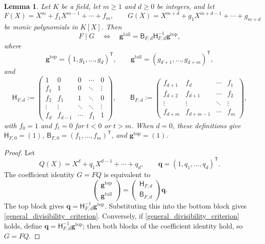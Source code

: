 \documentclass[12pt]{article}
\newtheorem{lemma}{Lemma}[section]
\theoremstyle{remark}
\begin{document}
\begin{lemma}\label{toeplitzdivision}
Let $K$ be a field, let $m\ge1$ and $d\ge0$ be integers, and let
\[
 F(X)=X^m+f_1X^{m-1}+\cdots+f_m,
 \qquad
 G(X)=X^{m+d}+g_1X^{m+d-1}+\cdots+g_{m+d}
\]
be monic polynomials in $K[X]$.  Then
\begin{equation}\label{general_divisibility_criterion}
 F\mid G
 \quad\Longleftrightarrow\quad
 \mathbf g^{\mathrm{tail}}
 =\mathsf B_{F,d}\mathsf H_{F,d}^{-1}\mathbf g^{\mathrm{top}},
\end{equation}
where
\[
 \mathbf g^{\mathrm{top}}=(1,g_1,\ldots,g_d)^{\mathsf T},
 \qquad
 \mathbf g^{\mathrm{tail}}=(g_{d+1},\ldots,g_{d+m})^{\mathsf T},
\]
and
\[
 \mathsf H_{F,d}:=
 \begin{pmatrix}
  1&0&0&\cdots&0\\
  f_1&1&0&\ddots&\vdots\\
  f_2&f_1&1&\ddots&0\\
  \vdots&\vdots&\ddots&\ddots&\vdots\\
  f_d&f_{d-1}&\cdots&f_1&1
 \end{pmatrix},
 \qquad
 \mathsf B_{F,d}:=
 \begin{pmatrix}
  f_{d+1}&f_d&\cdots&f_1\\
  f_{d+2}&f_{d+1}&\cdots&f_2\\
  \vdots&\vdots&\ddots&\vdots\\
  f_{d+m}&f_{d+m-1}&\cdots&f_m
 \end{pmatrix},
\]
with $f_0=1$ and $f_t=0$ for $t<0$ or $t>m$.
When $d=0$, these definitions give
$\mathsf H_{F,0}=(1)$, $\mathsf B_{F,0}=(f_1,\ldots,f_m)^{\mathsf T}$,
and $\mathbf g^{\mathrm{top}}=(1)$.
\end{lemma}
\begin{proof}
Let
\[
 Q(X)=X^d+q_1X^{d-1}+\cdots+q_d,
 \qquad
 \mathbf q=(1,q_1,\ldots,q_d)^{\mathsf T}.
\]
The coefficient identity $G=FQ$ is equivalent to
\[
 \begin{pmatrix}
  \mathbf g^{\mathrm{top}}\\[1mm]
  \mathbf g^{\mathrm{tail}}
 \end{pmatrix}
 =
 \begin{pmatrix}
  \mathsf H_{F,d}\\[1mm]
  \mathsf B_{F,d}
 \end{pmatrix}
 \mathbf q.
\]
The top block gives
$\mathbf q=\mathsf H_{F,d}^{-1}\mathbf g^{\mathrm{top}}$.
Substituting this into the bottom block gives
\eqref{general_divisibility_criterion}.  Conversely, if
\eqref{general_divisibility_criterion} holds, define
$\mathbf q=\mathsf H_{F,d}^{-1}\mathbf g^{\mathrm{top}}$; then both
blocks of the coefficient identity hold, so $G=FQ$.
\end{proof}
\end{document}

